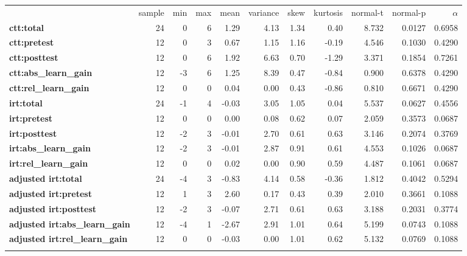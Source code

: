 \documentclass[]{article}
\begin{document}
\begin{longtable}[c]{@{}lrrrrrrrrrr@{}}
\toprule\addlinespace
& sample & min & max & mean & variance & skew & kurtosis & normal-t &
normal-p & $\alpha$
\\\addlinespace
\midrule\endhead
\textbf{ctt:total} & 24 & 0 & 6 & 1.29 & 4.13 & 1.34 & 0.40 & 8.732 &
0.0127 & 0.6958
\\\addlinespace
\textbf{ctt:pretest} & 12 & 0 & 3 & 0.67 & 1.15 & 1.16 & -0.19 & 4.546 &
0.1030 & 0.4290
\\\addlinespace
\textbf{ctt:posttest} & 12 & 0 & 6 & 1.92 & 6.63 & 0.70 & -1.29 & 3.371
& 0.1854 & 0.7261
\\\addlinespace
\textbf{ctt:abs\_learn\_gain} & 12 & -3 & 6 & 1.25 & 8.39 & 0.47 & -0.84
& 0.900 & 0.6378 & 0.4290
\\\addlinespace
\textbf{ctt:rel\_learn\_gain} & 12 & 0 & 0 & 0.04 & 0.00 & 0.43 & -0.86
& 0.810 & 0.6671 & 0.4290
\\\addlinespace
\textbf{irt:total} & 24 & -1 & 4 & -0.03 & 3.05 & 1.05 & 0.04 & 5.537 &
0.0627 & 0.4556
\\\addlinespace
\textbf{irt:pretest} & 12 & 0 & 0 & 0.00 & 0.08 & 0.62 & 0.07 & 2.059 &
0.3573 & 0.0687
\\\addlinespace
\textbf{irt:posttest} & 12 & -2 & 3 & -0.01 & 2.70 & 0.61 & 0.63 & 3.146
& 0.2074 & 0.3769
\\\addlinespace
\textbf{irt:abs\_learn\_gain} & 12 & -2 & 3 & -0.01 & 2.87 & 0.91 & 0.61
& 4.553 & 0.1026 & 0.0687
\\\addlinespace
\textbf{irt:rel\_learn\_gain} & 12 & 0 & 0 & 0.02 & 0.00 & 0.90 & 0.59 &
4.487 & 0.1061 & 0.0687
\\\addlinespace
\textbf{adjusted irt:total} & 24 & -4 & 3 & -0.83 & 4.14 & 0.58 & -0.36
& 1.812 & 0.4042 & 0.5294
\\\addlinespace
\textbf{adjusted irt:pretest} & 12 & 1 & 3 & 2.60 & 0.17 & 0.43 & 0.39 &
2.010 & 0.3661 & 0.1088
\\\addlinespace
\textbf{adjusted irt:posttest} & 12 & -2 & 3 & -0.07 & 2.71 & 0.61 &
0.63 & 3.188 & 0.2031 & 0.3774
\\\addlinespace
\textbf{adjusted irt:abs\_learn\_gain} & 12 & -4 & 1 & -2.67 & 2.91 &
1.01 & 0.64 & 5.199 & 0.0743 & 0.1088
\\\addlinespace
\textbf{adjusted irt:rel\_learn\_gain} & 12 & 0 & 0 & -0.03 & 0.00 &
1.01 & 0.62 & 5.132 & 0.0769 & 0.1088
\\\addlinespace
\bottomrule
\end{longtable}
\end{document}
